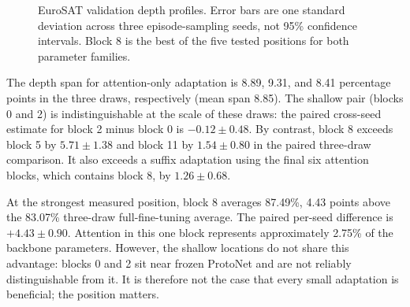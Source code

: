 \documentclass[11pt]{article}
\begin{document}
\begin{figure}[t]
\centering
{}
\caption{EuroSAT validation depth profiles. Error bars are one standard deviation across three episode-sampling seeds, not 95\% confidence intervals. Block 8 is the best of the five tested positions for both parameter families.}
\label{fig:depthcurves}
\end{figure}

The depth span for attention-only adaptation is 8.89, 9.31, and 8.41 percentage points in the three draws, respectively (mean span 8.85). The shallow pair (blocks 0 and 2) is indistinguishable at the scale of these draws: the paired cross-seed estimate for block 2 minus block 0 is $-0.12\pm0.48$. By contrast, block 8 exceeds block 5 by $5.71\pm1.38$ and block 11 by $1.54\pm0.80$ in the paired three-draw comparison. It also exceeds a suffix adaptation using the final six attention blocks, which contains block 8, by $1.26\pm0.68$.

At the strongest measured position, block 8 averages 87.49\%, 4.43 points above the 83.07\% three-draw full-fine-tuning average. The paired per-seed difference is $+4.43\pm0.90$. Attention in this one block represents approximately 2.75\% of the backbone parameters. However, the shallow locations do not share this advantage: blocks 0 and 2 sit near frozen ProtoNet and are not reliably distinguishable from it. It is therefore not the case that every small adaptation is beneficial; the position matters.
\end{document}
